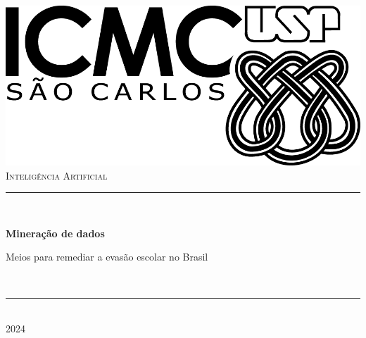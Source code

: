 \begin{titlepage}


\newcommand{\HRule}{\rule{\linewidth}{0.5mm}} %


\center
\includegraphics[width=10
cm]{Graphics/LogoICMC.png}\\[1cm]


\textsc{\large Inteligência Artificial}\\[1.5cm]

\makeatletter
\rule{\linewidth}{0.2 mm} \\[0.4 cm]
{\huge\bfseries Mineração de dados\\\Large{Meios para remediar a evasão escolar no Brasil\par}}\ \
\rule{\linewidth}{0.2 mm} \\[1.0 cm]

\vspace{1cm}
\vspace{1cm}
\makeatother
{\large 2024}\\[2cm] %
\vfill %





\end{titlepage}


